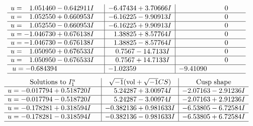 \documentclass[1p]{elsarticle_modified}
\theoremstyle{definition}
\newcommand{\I}{\sqrt{-1}}
\begin{document}
$$\begin{array}{c|c|c}
\begin{aligned}
u &= \phantom{-}1.051460 - 0.642911 I\end{aligned}
 & -6.47434 + 3.70666 I & \phantom{-0.000000 } 0 \\ \hline\begin{aligned}
u &= \phantom{-}1.052550 + 0.660953 I\end{aligned}
 & -6.16225 - 9.90913 I & \phantom{-0.000000 } 0 \\ \hline\begin{aligned}
u &= \phantom{-}1.052550 - 0.660953 I\end{aligned}
 & -6.16225 + 9.90913 I & \phantom{-0.000000 } 0 \\ \hline\begin{aligned}
u &= -1.046730 + 0.676138 I\end{aligned}
 & \phantom{-}1.38825 + 8.57764 I & \phantom{-0.000000 } 0 \\ \hline\begin{aligned}
u &= -1.046730 - 0.676138 I\end{aligned}
 & \phantom{-}1.38825 - 8.57764 I & \phantom{-0.000000 } 0 \\ \hline\begin{aligned}
u &= \phantom{-}1.050950 + 0.676533 I\end{aligned}
 & \phantom{-}0.7567 - 14.7133 I & \phantom{-0.000000 } 0 \\ \hline\begin{aligned}
u &= \phantom{-}1.050950 - 0.676533 I\end{aligned}
 & \phantom{-}0.7567 + 14.7133 I & \phantom{-0.000000 } 0 \\ \hline\begin{aligned}
u &= -0.684394\phantom{ +0.000000I}\end{aligned}
 & -1.02359\phantom{ +0.000000I} & -9.41090\phantom{ +0.000000I}\\
 \hline 
 \end{array}$$\newpage$$\begin{array}{c|c|c}  
\text{Solutions to }I^u_{1}& \I (\text{vol} + \sqrt{-1}CS) & \text{Cusp shape}\\
 \hline 
\begin{aligned}
u &= -0.017794 + 0.518720 I\end{aligned}
 & \phantom{-}5.24287 + 3.00974 I & -2.07163 - 2.91236 I \\ \hline\begin{aligned}
u &= -0.017794 - 0.518720 I\end{aligned}
 & \phantom{-}5.24287 - 3.00974 I & -2.07163 + 2.91236 I \\ \hline\begin{aligned}
u &= -0.178281 + 0.318594 I\end{aligned}
 & -0.382136 + 0.981633 I & -6.53805 - 6.72584 I \\ \hline\begin{aligned}
u &= -0.178281 - 0.318594 I\end{aligned}
 & -0.382136 - 0.981633 I & -6.53805 + 6.72584 I\\
 \hline 
 \end{array}$$\newpage
\end{document}
